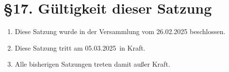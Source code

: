 \documentclass[12pt]{article}
\newcommand{\satzungsdatum}{05.03.2025}
\begin{document}
\section*{§17. Gültigkeit dieser Satzung}

\begin{enumerate}
	\item
		Diese Satzung wurde in der Versammlung vom 26.02.2025
		beschlossen.
	\item
		Diese Satzung tritt am \satzungsdatum \ in Kraft.
	\item
		Alle bisherigen Satzungen treten damit außer Kraft.
\end{enumerate}
\end{document}
